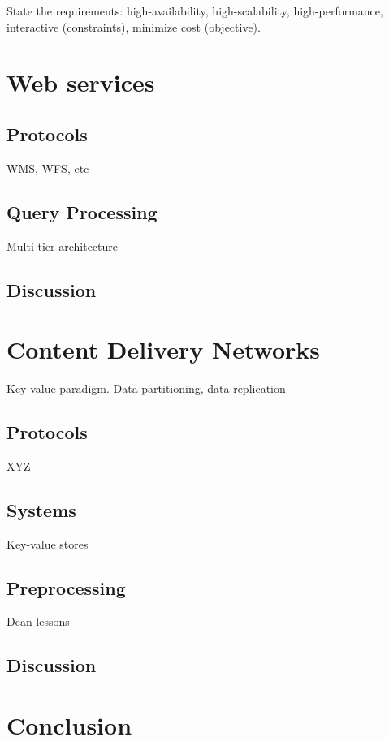 \documentclass[11pt, oneside]{report}
\begin{document}
State the requirements: high-availability, high-scalability, high-performance, interactive (constraints), minimize cost (objective).

\section{Web services}

\subsection{Protocols}
WMS, WFS, etc

\subsection{Query Processing}
Multi-tier architecture

\subsection{Discussion}

\section{Content Delivery Networks}
Key-value paradigm. Data partitioning, data replication

\subsection{Protocols}
XYZ

\subsection{Systems}
Key-value stores

\subsection{Preprocessing}
Dean lessons

\subsection{Discussion}

\section{Conclusion}
\end{document}
